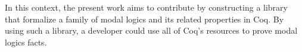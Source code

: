 \documentclass[sigconf,anonymous]{acmart}
\begin{document}
In this context, the present work aims to contribute by constructing a library
that formalize a family of modal logics and its related properties in Coq.
By using such a library, a developer could use all of Coq's resources to prove
modal logics facts.




\end{document}
